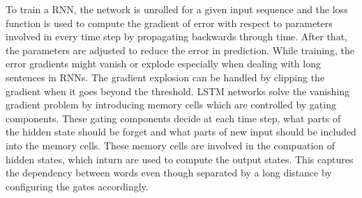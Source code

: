 \documentclass[a4paper, 11pt]{article}
\newcommand{\R}{\mathbb{R}}
\begin{document}
To train a RNN, the network is unrolled for a given input sequence and the loss function is used to compute the gradient of error with respect to parameters involved in every time step by propagating backwards through time. After that, the parameters are adjusted to reduce the error in prediction\cite{Werbos1990}. While training, the error gradients might vanish or explode especially when dealing with long sentences in RNNs. The gradient explosion can be handled by clipping the gradient when it goes beyond the threshold. LSTM networks \cite{Hochreiter1997} solve the vanishing gradient problem by introducing memory cells which are controlled by gating components. These gating components decide at each time step, what parts of the hidden state should be forget and what parts of new input should be included into the memory cells. These memory cells are involved in the compuation of hidden states, which inturn are used to compute the output states. This captures the dependency between words even though separated by a long distance by configuring the gates accordingly.

\end{document}
